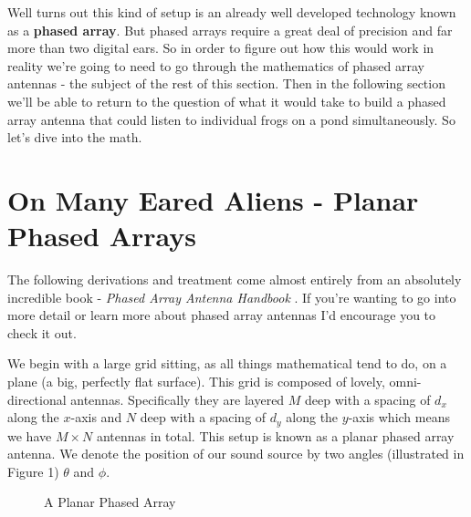 \documentclass[12pt,a6paper]{book}
\begin{document}
Well turns out this kind of setup is an already well developed technology known as a \textbf{phased array}. But phased arrays require a great deal of precision and far more than two digital ears. So in order to figure out how this would work in reality we're going to need to go through the mathematics of phased array antennas - the subject of the rest of this section. Then in the following section we'll be able to return to the question of what it would take to build a phased array antenna that could listen to individual frogs on a pond simultaneously. So let's dive into the math. 

\section{On Many Eared Aliens - Planar Phased Arrays}
The following derivations and treatment come almost entirely from an absolutely incredible book - \textit{Phased Array Antenna Handbook} \cite{phasedhandbook}. If you're wanting to go into more detail or learn more about phased array antennas I'd encourage you to check it out. 

We begin with a large grid sitting, as all things mathematical tend to do, on a plane (a big, perfectly flat surface). This grid is composed of lovely, omni-directional antennas. Specifically they are layered $M$ deep with a spacing of $d_x$ along the $x$-axis  and $N$ deep with a spacing of $d_y$ along the $y$-axis which means we have $M\times N$ antennas in total. This setup is known as a planar phased array antenna. We denote the position of our sound source by two angles (illustrated in Figure 1) $\theta$ and $\phi$. 

\begin{figure}[!htb]
\caption{\label{fig:my-label} A Planar Phased Array}
\end{figure}
\end{document}
